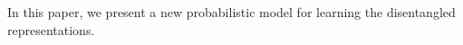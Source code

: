 In this paper, we present a new probabilistic model for learning the disentangled representations.  